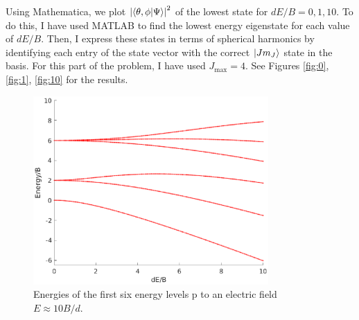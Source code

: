 \documentclass{article}
\theoremstyle{definition}
\begin{document}
\begin{enumerate}[label=(\alph*)]
	
	Using Mathematica, we plot $\abs{\bra{\theta,\phi}\ket{\Psi}}^2$ of the lowest state for $dE/B = 0, 1, 10$. To do this, I have used MATLAB to find the lowest energy eigenstate for each value of $dE/B$. Then, I express these states in terms of spherical harmonics by identifying each entry of the state vector with the correct $\ket{Jm_J}$ state in the basis. For this part of the problem, I have used $J_\text{max}=4$.  See Figures \ref{fig:0}, \ref{fig:1}, \ref{fig:10} for the results.	
	
	
	
	\begin{figure}[!htb]
		\centering
		\includegraphics[width=0.8\textwidth]{energies.eps}
		\caption{Energies of the first six energy levels p to an electric field $E \approx 10 B/d$.}
		\label{fig:energies}
	\end{figure}



\end{enumerate}
\end{document}
